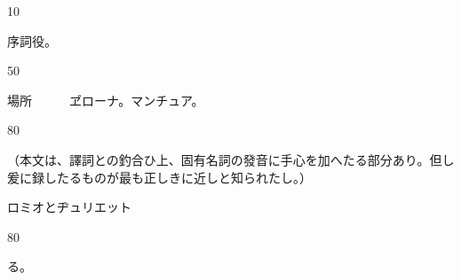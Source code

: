 \documentclass[tate,paper=b6j,jafontsize=9pt]{jlreq}
\begin{document}
\begin{azconvIndented}{1\zw}{0\zw}

序詞役。


\end{azconvIndented}
\begin{azconvIndented}{5\zw}{0\zw}

場所　　　ヹローナ。マンチュア。

\end{azconvIndented}
\begin{azconvIndented}{8\zw}{0\zw}

（本文は、譯詞との釣合ひ上、固有名詞の發音に手心を加へたる部分あり。但し爰に録したるものが最も正しきに近しと知られたし。）

\end{azconvIndented}

ロミオとヂュリエット





\begin{azconvIndented}{8\zw}{0\zw}

る。

\end{azconvIndented}
\end{document}
